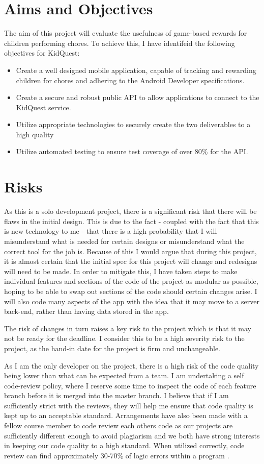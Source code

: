 \section{Aims and Objectives}
The aim of this project will evaluate the usefulness of game-based rewards for children performing chores. 
To achieve this, I have identifeid the following objectives for KidQuest:

\begin{itemize}
	\item Create a well designed mobile application, capable of tracking and rewarding children for chores and adhering to the Android Developer specifications.
	\item Create a secure and robust public API to allow applications to connect to the KidQuest service.
	\item Utilize appropriate technologies to securely create the two deliverables to a high quality
	\item Utilize automated testing to ensure test coverage of over 80\% for the API.
\end{itemize}

\section{Risks}
As this is a solo development project, there is a significant risk that there will be flaws in the initial design. 
This is due to the fact - coupled with the fact that this is new technology to me - that there is a high probability that I will misunderstand what is needed for certain designs or misunderstand what the correct tool for the job is.
Because of this I would argue that during this project, it is almost certain that the initial spec for this project will change and redesigns will need to be made. 
In order to mitigate this, I have taken steps to make individual features and sections of the code of the project as modular as possible, hoping to be able to swap out sections of the code should certain changes arise.
I will also code many aspects of the app with the idea that it may move to a server back-end, rather than having data stored in the app. 
 
The risk of changes in turn raises a key risk to the project which is that it may not be ready for the deadline. 
I consider this to be a high severity risk to the project, as the hand-in date for the project is firm and unchangeable. 

As I am the only developer on the project, there is a high risk of the code quality being lower than what can be expected from a team.
I am undertaking a self code-review policy, where I reserve some time to inspect the code of each feature branch before it is merged into the master branch.
I believe that if I am sufficiently strict with the reviews, they will help me ensure that code quality is kept up to an acceptable standard.
Arrangements have also been made with a fellow course member to code review each others code as our projects are sufficiently different enough to avoid plagiarism and we both have strong interests in keeping our code quality to a high standard.
When utilized correctly, code review can find approximately 30-70\% of logic errors within a program \citep{myers2011art}.

